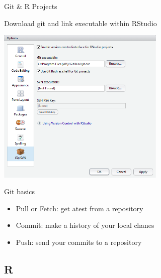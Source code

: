 \documentclass[
  ignorenonframetext,
]{beamer}
\providecommand{\tightlist}{%
  \setlength{\itemsep}{0pt}\setlength{\parskip}{0pt}}
\begin{document}
\begin{frame}{Git \& R Projects}
\protect\hypertarget{git-r-projects-1}{}

Download git and link executable within RStudio

\includegraphics[width=0.6\textwidth,height=\textheight]{../external/images/setup_1_rstudio_git.PNG}

\end{frame}

\begin{frame}{Git basics}
\protect\hypertarget{git-basics}{}

\begin{itemize}[<+->]
\tightlist
\item
  Pull or Fetch: get atest from a repository
\item
  Commit: make a history of your local chanes
\item
  Push: send your commits to a repository
\end{itemize}

\end{frame}

\hypertarget{r}{%
\subsection{R}\label{r}}
\end{document}
